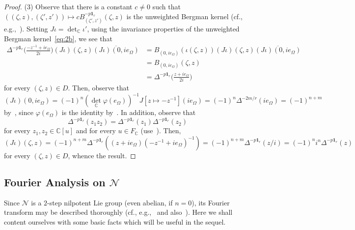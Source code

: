\documentclass[10.5pt,reqno]{amsart}
\newcommand{\vect}[1]{\mathbf{{#1}}}
\newcommand{\C}{\mathds{C}}
\newcommand{\Nc}{\mathcal{N}}
\renewcommand{\phi}{\varphi}
\begin{document}
\begin{proof}
	(3) Observe that there is a constant $c\neq 0$ such that $((\zeta,z),(\zeta',z'))\mapsto c B^{-p\vect 1_r}_{(\zeta',z')}(\zeta,z)$ is the unweighted Bergman kernel (cf., e.g.,~\cite[Proposition 3.11]{CalziPeloso}).
	Setting $J\iota=\det_\C \iota'$, using the invariance properties of the unweighted Bergman kernel~\eqref{eq:2b}, we see that 
	\[
	\begin{split}
		\Delta^{-p\vect 1_r}\Big(\frac{-z^{-1}+i e_\Omega}{2 i}\Big)(J\iota)(\zeta,z) \overline{(J\iota)(0, i e_\Omega)}&=B_{(0, i e_\Omega)}(\iota(\zeta,z)) (J\iota)(\zeta,z) \overline{(J\iota)(0, ie_\Omega)}\\
		&= B_{(0, i e_\Omega)}(\zeta,z)\\
		&=\Delta^{-p\vect 1_r}\Big(\frac{z+i e_\Omega}{2 i}\Big)
	\end{split}
	\]
	for every $(\zeta,z)\in D$. Then, observe that
	\[
	(J\iota)(0, i e_\Omega)=(-1)^n ({\det}_\C\phi(e_\Omega))^{-1} J[z\mapsto -z^{-1}](i e_\Omega)=(-1)^n\Delta^{-2 m/r}(i e_\Omega)=(-1)^{n+m} 
	\]
	by~\cite[p.~341]{FarautKoranyi}, since $\phi(e_\Omega)$ is the identity by~\cite[formula (1.12)]{Dorfmeister}. In addition, observe that
	\[
	\Delta^{-p\vect 1_r}(z_1 z_2)=\Delta^{-p\vect 1_r}(z_1)\Delta^{-p\vect 1_r}(z_2)
	\]
	for every $z_1,z_2\in \C[u]$ and for every $u\in F_\C$  (use~\cite[Proposition II.2.2]{FarautKoranyi}). Then,
	\[
	(J\iota)(\zeta,z)=(-1)^{n+m}\Delta^{-p\vect 1_r}((z+i e_\Omega)  (-z^{-1}+i e_\Omega)^{-1} )=(-1)^{n+m }\Delta^{-p\vect 1_r}(z/i )=(-1)^n i^{n} \Delta^{-p\vect 1_r}(z)
	\]
	for every $(\zeta,z)\in D$, whence the result.
\end{proof}


\subsection{Fourier Analysis on $\Nc$}\label{sec:Fourier}

Since $\Nc$ is a $2$-step nilpotent Lie group (even abelian, if $n=0$), its Fourier transform may be described thoroughly (cf., e.g.,~\cite{OV,Astengoetal} and also~\cite{PWS}).
Here we shall content ourselves with some basic facts which will be useful in the sequel. 
\end{document}

